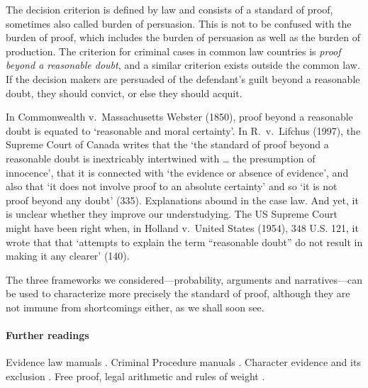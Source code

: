 \documentclass[10pt]{article}
\begin{document}
The decision criterion is defined by law 
and consists of a standard of proof, sometimes also called burden of persuasion. This is not to be confused with 
the burden of proof, which includes the burden of persuasion as well as the burden of production.
The criterion for criminal cases in common law countries is 
\textit{proof beyond a reasonable doubt}, and a similar criterion exists outside the common law.
 If the decision makers are persuaded of the defendant's guilt beyond a reasonable doubt, 
 they should convict, or else they should acquit.  

In Commonwealth v.\ Massachusetts Webster (1850), 
proof beyond a reasonable doubt is equated to 
`reasonable and moral certainty'. In R.\ v.\ Lifchus (1997),  the Supreme Court of Canada writes that 
the `the standard of proof beyond a reasonable 
doubt is inextricably intertwined with \dots 
the presumption of innocence', that it is connected with `the evidence or  
absence of evidence', and also that `it does not involve proof to an absolute certainty' and so 
`it is not proof beyond any doubt' (335). 
Explanations abound in the case law. And yet, it is unclear 
whether they improve our understudying. The US Supreme Court might have been right when, in Holland v.\ United States (1954), 348 U.S. 121, 
it wrote that that `attempts to explain the term ``reasonable doubt'' do not result in making it any clearer' (140).
 
 
The three frameworks we considered---probability, arguments and narratives---can be used to characterize 
more precisely the standard of proof, although they are not immune from shortcomings either, 
as we shall soon see.


\paragraph{Further readings}
Evidence law manuals  \citep{fisher2008,  mendez2008}. 
Criminal Procedure manuals \citep{allenEtAl2011}.
Character evidence and its exclusion \citep{redmayne2015}.
Free proof, legal arithmetic and rules of weight \cited{}.
 
\end{document}
